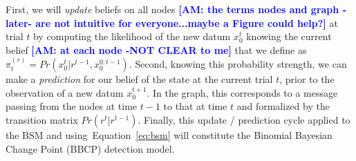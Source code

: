 \documentclass[12pt,english]{article}%
\newcommand{\seeEq}[1]{Equation~\ref{eq:#1}}
\newcommand{\AM}[1]{\textbf{\textcolor{blue}{[AM: #1]}}}
\begin{document}
First, we will \emph{update} beliefs on all nodes \AM{the terms nodes and graph -later- are not intuitive for everyone...maybe a Figure could help?} at trial $t$
by computing the likelihood of the new datum $x_0^t$ knowing the current belief \AM{at each node -NOT CLEAR to me} that we define as $\pi^{(r)}_t=Pr(x_0^t | r^{t-1}, x_0^{0:t-1})$.
Second, knowing this probability strength, %
we can make a \emph{prediction} for our belief of the state at the current trial $t$,
prior to the observation of a new datum $x_0^{t+1}$.
In the graph, this corresponds to a message passing from the nodes at time $t-1$
to that at time $t$ and formalized by the transition matrix $Pr(r^t | r^{t-1})$.
Finally, this update / prediction cycle applied to the BSM and using~\seeEq{bsm}
will constitute the Binomial Bayesian Change Point (BBCP) detection model.
\end{document}
